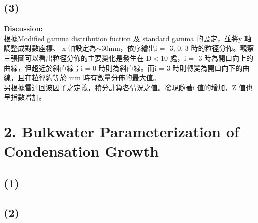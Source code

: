 \documentclass{article}
\begin{document}
\begin{CJK*}{UTF8}{bsmi}
\subsection*{(3)}
    \begin{spacing}{3}
        \begin{large}
            \textbf{Discussion:} \\
                根據\;Modified gamma distribution fuction 及 \;standard gamma 的設定，並將\;y 軸調整成對數座標、
                x 軸設定為$\sim$30\;mm，依序繪出\;i = -3, 0, 3 時的粒徑分佈。觀察三張圖可以看出粒徑分佈的主要變化是發生在
                \;D$<$10 處，i = -3 時為開口向上的曲線，但趨近於斜直線；i = 0 時則為斜直線。而\;i = 3 時則轉變為開口向下的曲
                線，且在粒徑約等於 mm 時有數量分佈的最大值。\\
                另根據雷達回波因子之定義，積分計算各情況之值。發現隨著\;i 值的增加，Z 值也呈指數增加。
        \end{large}
    \end{spacing}


\section*{2. Bulkwater Parameterization of Condensation Growth}

\subsection*{(1)}

\subsection*{(2)}


\end{CJK*}
\end{document}
